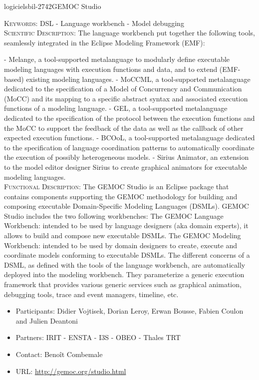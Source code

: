 \documentclass{ra2018}
\begin{document}
 \begin{module}{logiciels}{bil-2742}{GEMOC Studio}

   \textsc{Keywords:} DSL - Language workbench - Model debugging \\ 


    \textsc{Scientific Description:} The language workbench put together the following tools, seamlessly integrated in the Eclipse Modeling Framework (EMF):


- Melange, a tool-supported metalanguage to modularly define executable modeling languages with execution functions and data, and to extend (EMF-based) existing modeling languages.
- MoCCML, a tool-supported metalanguage dedicated to the specification of a Model of Concurrency and Communication (MoCC) and its mapping to a specific abstract syntax and associated execution functions of a modeling language.
- GEL, a tool-supported metalanguage dedicated to the specification of the protocol between the execution functions and the MoCC to support the feedback of the data as well as the callback of other expected execution functions.
- BCOoL, a tool-supported metalanguage dedicated to the specification of language coordination patterns to automatically coordinate the execution of possibly heterogeneous models.
- Sirius Animator, an extension to the model editor designer Sirius to create graphical animators for executable modeling languages.\\

 \textsc{Functional Description:}  The GEMOC Studio is an Eclipse package that contains components supporting the GEMOC methodology for building and composing executable Domain-Specific Modeling Languages (DSMLs). GEMOC Studio includes the two following workbenches:
    The GEMOC Language Workbench: intended to be used by language designers (aka domain experts), it allows to build and compose new executable DSMLs.
    The GEMOC Modeling Workbench: intended to be used by domain designers to create, execute and coordinate models conforming to executable DSMLs. The different concerns of a DSML, as defined with the tools of the language workbench, are automatically deployed into the modeling workbench. They parameterize a generic execution framework that provides various generic services such as graphical animation, debugging tools, trace and event managers, timeline, etc.\\

   \begin{itemize}
      \item Participants: Didier Vojtisek, Dorian Leroy, Erwan Bousse, Fabien Coulon and Julien Deantoni
      \item Partners: IRIT - ENSTA - I3S - OBEO - Thales TRT
      \item Contact: Benoît Combemale
      \item URL: \url{http://gemoc.org/studio.html}
   \end{itemize}

 \end{module}
\end{document}
